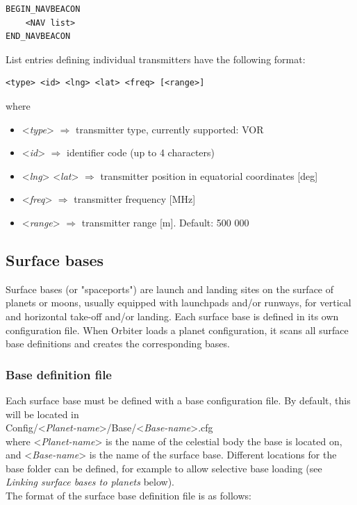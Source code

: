 \documentclass[Orbiter Developer Manual.tex]{subfiles}
\begin{document}
\begin{lstlisting}[language=OSFS]
BEGIN_NAVBEACON
	<NAV list>
END_NAVBEACON
\end{lstlisting}

\noindent
List entries defining individual transmitters have the following format:

\begin{lstlisting}[language=OSFS]
<type> <id> <lng> <lat> <freq> [<range>]
\end{lstlisting}

\noindent
where

\begin{itemize}
\item <\textit{type}> $\Rightarrow$ transmitter type, currently supported: VOR
\item <\textit{id}> $\Rightarrow$ identifier code (up to 4 characters)
\item <\textit{lng}> <\textit{lat}> $\Rightarrow$ transmitter position in equatorial coordinates [deg]
\item <\textit{freq}> $\Rightarrow$ transmitter frequency [MHz]
\item <\textit{range}> $\Rightarrow$ transmitter range [m]. Default: 500 000
\end{itemize}


\subsection{Surface bases}
\label{ssec:surface_bases}
Surface bases (or "spaceports") are launch and landing sites on the surface of planets or moons, usually equipped with launchpads and/or runways, for vertical and horizontal take-off and/or landing. Each surface base is defined in its own configuration file. When Orbiter loads a planet configuration, it scans all surface base definitions and creates the corresponding bases.

\subsubsection*{Base definition file}
Each surface base must be defined with a base configuration file. By default, this will be located in\\
\indent Config/<\textit{Planet-name}>/Base/<\textit{Base-name}>.cfg\\
where <\textit{Planet-name}> is the name of the celestial body the base is located on, and <\textit{Base-name}> is the name of the surface base. Different locations for the base folder can be defined, for example to allow selective base loading (see \textit{Linking surface bases to planets} below).\\
The format of the surface base definition file is as follows:
\end{document}
